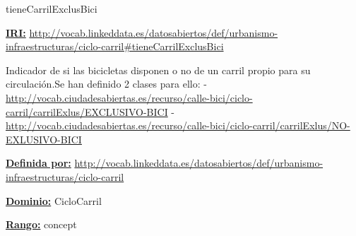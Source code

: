 \begin{mybox}{tieneCarrilExclusBici}
\begin{flushleft}
\underline{\textbf{IRI:}}
\url{http://vocab.linkeddata.es/datosabiertos/def/urbanismo-infraestructuras/ciclo-carril#tieneCarrilExclusBici}
\newline

Indicador de si las bicicletas disponen o no de un carril propio para su circulación.Se han definido 2 clases para ello:
\newline -	\url{http://vocab.ciudadesabiertas.es/recurso/calle-bici/ciclo-carril/carrilExlus/EXCLUSIVO-BICI}
\newline -	 \url{http://vocab.ciudadesabiertas.es/recurso/calle-bici/ciclo-carril/carrilExlus/NO-EXLUSIVO-BICI}
\newline


\underline{\textbf{Definida por:}}
\url{http://vocab.linkeddata.es/datosabiertos/def/urbanismo-infraestructuras/ciclo-carril}
\newline

\underline{\textbf{Dominio:}}
	CicloCarril
\newline

\underline{\textbf{Rango:}}
	concept
\newline

\end{flushleft}
\end{mybox}







